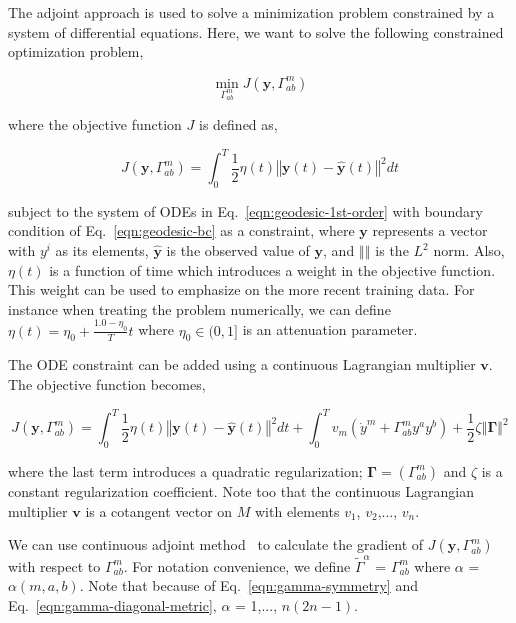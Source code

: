 \documentclass{article}
\begin{document}
The adjoint approach is used to solve a minimization problem
constrained by a system of differential equations. Here, we want to
solve the following constrained optimization problem,

\begin{equation}\label{eqn:optimization-problem}
\min_{\Gamma^{m}_{ab}} J(\boldsymbol{y},\Gamma^{m}_{ab})
\end{equation}

where the objective function $J$ is defined as,

\begin{equation}\label{eqn:optimization-objective-raw}
J(\boldsymbol{y},\Gamma^{m}_{ab}) = \int_{0}^{T} \frac{1}{2} \eta(t)
\left\Vert \boldsymbol{y}(t) - \hat{\boldsymbol{y}}(t) \right\Vert^{2}
dt
\end{equation}

subject to the system of ODEs in Eq.~\ref{eqn:geodesic-1st-order} with
boundary condition of Eq.~\ref{eqn:geodesic-bc} as a constraint, where
$\boldsymbol{y}$ represents a vector with $y^{i}$ as its elements,
$\hat{\boldsymbol{y}}$ is the observed value of $\boldsymbol{y}$, and
$\left\Vert \right\Vert$ is the $L^{2}$ norm. Also, $\eta(t)$ is a
function of time which introduces a weight in the objective
function. This weight can be used to emphasize on the more recent
training data. For instance when treating the problem numerically, we
can define $\eta(t) = \eta_{0} + \frac{1.0 - \eta_{0}}{T} t$ where
$\eta_{0} \in (0,1]$ is an attenuation parameter.

The ODE constraint can be added using a continuous Lagrangian
multiplier $\boldsymbol{v}$. The objective function becomes,

\begin{equation}\label{eqn:optimization-objective}
J(\boldsymbol{y},\Gamma^{m}_{ab}) = \int_{0}^{T} \frac{1}{2} \eta(t)
\left\Vert \boldsymbol{y}(t) - \hat{\boldsymbol{y}}(t) \right\Vert^{2} dt +
\int_{0}^{T} v_{m} \left( \dot{y}^{m} + \Gamma^{m}_{ab} y^{a} y^{b}
\right) + \frac{1}{2} \zeta \left\Vert \boldsymbol{\Gamma} \right\Vert^{2}
\end{equation}

where the last term introduces a quadratic regularization;
$\boldsymbol{\Gamma} = \left(\Gamma^{m}_{ab}\right)$ and $\zeta$ is a
constant regularization coefficient. Note too that the continuous
Lagrangian multiplier $\boldsymbol{v}$ is a cotangent vector on $M$
with elements $v_{1}$, $v_{2}$,..., $v_{n}$.

We can use continuous adjoint method~\cite{ref:adjoint-giles} to
calculate the gradient of $J(\boldsymbol{y},\Gamma^{m}_{ab})$ with
respect to $\Gamma^{m}_{ab}$. For notation convenience, we define
$\tilde{\Gamma}^{\alpha}$ = $\Gamma^{m}_{ab}$ where $\alpha$ =
$\alpha(m,a,b)$. Note that because of Eq.~\ref{eqn:gamma-symmetry} and
Eq.~\ref{eqn:gamma-diagonal-metric}, $\alpha$ = 1,..., $n (2n - 1)$.
\end{document}
